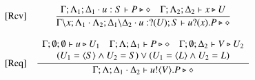\begin{figure}[t]
\[\begin{array}{lc}
		\trule{Rcv}& \tree{
		\Gamma; \Lambda_1; \Delta_1 \cat u: S \proves P \hastype \Proc
			\quad
			\Gamma; \Lambda_2; \Delta_2 \proves {x} \hastype {U}
		}{
			\Gamma \backslash x; \Lambda_1\cat \Lambda_2; \Delta_1\backslash \Delta_2 \cat u: \btinp{U} S \vdash \binp{u}{{x}} P \hastype \Proc
		}
\\[6mm]



		\trule{Req}& \tree{
			\begin{array}{c}
				\Gamma; \es; \es \proves u \hastype U_1
				\quad
				\Gamma; \Lambda; \Delta_1 \proves P \hastype \Proc
				\quad
				\Gamma; \es; \Delta_2 \proves V \hastype U_2
				\\
				(U_1 = \chtype{S} 
                                \land %
                                U_2 = S)
				\lor
				 (U_1 = \chtype{L} 
                                \land %
                                 U_2 = L)
			\end{array}
		}{
			\Gamma; \Lambda; \Delta_1 \cat \Delta_2 \proves \bout{u}{V} P \hastype \Proc
		}
		\\[6mm]


\end{array}\]
\end{figure}
